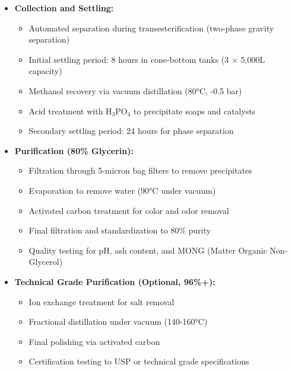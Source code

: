 \begin{itemize}
    \item \textbf{Collection and Settling:}
    \begin{itemize}
        \item Automated separation during transesterification (two-phase gravity separation)
        \item Initial settling period: 8 hours in cone-bottom tanks (3 × 5,000L capacity)
        \item Methanol recovery via vacuum distillation (80°C, -0.5 bar)
        \item Acid treatment with H$_3$PO$_4$ to precipitate soaps and catalysts
        \item Secondary settling period: 24 hours for phase separation
    \end{itemize}
    
    \item \textbf{Purification (80\% Glycerin):}
    \begin{itemize}
        \item Filtration through 5-micron bag filters to remove precipitates
        \item Evaporation to remove water (90°C under vacuum)
        \item Activated carbon treatment for color and odor removal
        \item Final filtration and standardization to 80\% purity
        \item Quality testing for pH, ash content, and MONG (Matter Organic Non-Glycerol)
    \end{itemize}
    
    \item \textbf{Technical Grade Purification (Optional, 96\%+):}
    \begin{itemize}
        \item Ion exchange treatment for salt removal
        \item Fractional distillation under vacuum (140-160°C)
        \item Final polishing via activated carbon
        \item Certification testing to USP or technical grade specifications
    \end{itemize}
\end{itemize}

